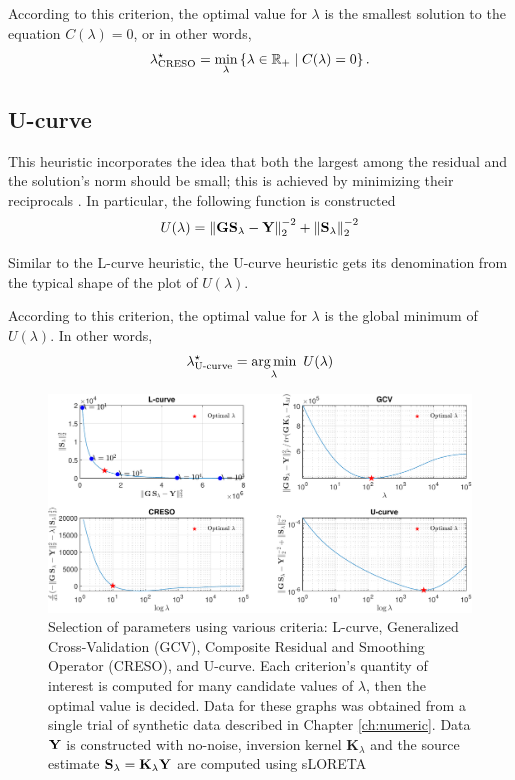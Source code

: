 According to this criterion, the optimal value for $\lambda$ is the smallest solution to the equation $C(\lambda)=0$, or in other words,
\begin{equation}
    \lambda^\star_\text{CRESO} = 
    \min_\lambda \left\{ \lambda\in \mathbb{R}_+ \;\middle|\; C(\lambda)=0 \right\}.
\end{equation}

\subsection{U-curve}

This heuristic incorporates the idea that both the largest among the residual and the solution's norm should be small; this is achieved by minimizing their reciprocals \cite{Ucurve}.
%
In particular, the following function is constructed
\begin{equation}
U(\lambda) = 
\left\lVert \mathbf{G}\mathbf{S}_\lambda - \mathbf{Y} \right\rVert_2^{-2} + \left\lVert \mathbf{S}_\lambda \right\rVert_2^{-2}
\end{equation}

Similar to the L-curve heuristic, the U-curve heuristic gets its denomination from the typical shape of the plot of $U(\lambda)$.

According to this criterion, the optimal value for $\lambda$ is the global minimum of $U(\lambda)$.
%
In other words,
\begin{equation}
    \lambda^\star_\text{U-curve} = 
    \operatorname*{arg\,min}_\lambda\,\, U(\lambda)
\end{equation}

\begin{figure}
\centering
\includegraphics[width=1\linewidth]{./img_MATLAB/ParTuning_sLORETA}
\caption{Selection of parameters using various criteria: L-curve, Generalized Cross-Validation (GCV), Composite Residual and Smoothing Operator (CRESO), and U-curve. 
%
Each criterion's quantity of interest is computed for many candidate values of $\lambda$, then the optimal value is decided.
%
Data for these graphs was obtained from a single trial of synthetic data described in Chapter \ref{ch:numeric}. Data $\mathbf{Y}$ is constructed with no-noise, inversion kernel $\mathbf{K}_\lambda$ and the source estimate $\mathbf{S}_\lambda = \mathbf{K}_\lambda \mathbf{Y}$ are computed using sLORETA
}
\label{fig:tuning}
\end{figure}

